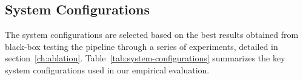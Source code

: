 \subsection{System Configurations}\label{subsec:empirical-evaluation:experimental-setup:system-configurations}
The system configurations are selected based on the best results obtained from black-box testing the pipeline through a series of experiments, detailed in section~\ref{ch:ablation}.
Table~\ref{tab:system-configurations} summarizes the key system configurations used in our empirical evaluation.

